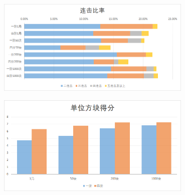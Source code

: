\documentclass[10pt,UTF8]{article}
\newenvironment{Figure}
  {\par\medskip\noindent\minipage{\linewidth}}
  {\endminipage\par\medskip}
\begin{document}
\begin{Figure}
    \centering
    \includegraphics[width=0.7\textwidth]{figure/result2.png}
\end{Figure}

\begin{Figure}
    \centering
    \includegraphics[width=0.7\textwidth]{figure/result3.png}
\end{Figure}
\end{document}
